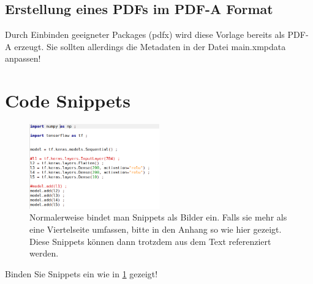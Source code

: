 \documentclass[12pt,oneside]{article}
\begin{document}
\subsection{Erstellung eines PDFs im PDF-A Format}
Durch Einbinden geeigneter Packages (pdfx) wird diese Vorlage bereits als PDF-A erzeugt. Sie sollten allerdings die Metadaten in der Datei main.xmpdata anpassen!

\clearpage
\def\UrlBreaks{\do\/\do-} %



\appendix
\section{Code Snippets}
\begin{figure}
    \centering
    \includegraphics[width=0.5\textwidth]{snippet.png}
    \caption{Normalerweise bindet man Snippets als Bilder ein. Falls sie mehr als eine Viertelseite umfassen, bitte in den Anhang so wie hier gezeigt. Diese Snippets können dann trotzdem aus dem Text referenziert werden.\label{Snippet}
    }
\end{figure}
Binden Sie Snippets ein wie in \ref{Snippet} gezeigt!
\end{document}
